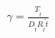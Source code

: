 \documentclass[10pt]{article}
\begin{document}
\begin{align*} \gamma = \frac{{T_{\tilde{t}}}}{{D_{\tilde{t}}}{R_{\tilde{t}}}\tilde{t}}\end{align*}
\end{document}

